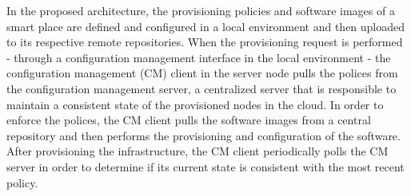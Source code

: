 In the proposed architecture, the provisioning policies and software images of a smart place are
defined and configured in a local environment and then uploaded to its respective remote repositories. 
When the provisioning request is performed - through a configuration management interface in the local
environment - the configuration management (CM) client in the server node pulls the polices from the
configuration management server, a centralized server that is responsible to maintain a consistent
state of the provisioned nodes in the cloud. In order to enforce the polices, the CM client pulls the
software images from a central repository and then performs the provisioning and configuration of
the software. After provisioning the infrastructure, the CM client periodically polls the CM server
in order to determine if its current state is consistent with the most recent policy.
